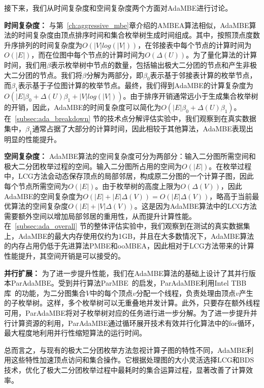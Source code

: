 接下来，我们从时间复杂度和空间复杂度两个方面对AdaMBE进行讨论。

\textbf{时间复杂度：} 与第~\ref{ch:aggressive_mbe}章介绍的AMBEA算法相似，AdaMBE算法的时间复杂度由顶点排序时间和集合枚举树生成时间组成。其中，按照顶点度数升序排列的时间复杂度为$O(|V|log(|V|))$，在邻接表中每个节点的计算时间为$O(|E|)$，而在位图中每个节点的计算时间为$O(\Delta(U))$。为了量化算法的计算时间，我们用$\beta$表示枚举树中节点的数量，包括输出极大二分团的节点和产生非极大二分团的节点。我们将$\beta$分解为两部分，即$\beta_0$表示基于邻接表计算的枚举节点，而$\beta_1$表示基于子位图计算的枚举节点。最终，我们得到AdaMBE的计算复杂度为$O(|E|\beta_0 + \Delta(U)\beta_1 + |V|log(|V|))$。由于排序开销通常远小于生成集合枚举树的开销，因此，AdaMBE的时间复杂度可以简化为$O(|E|\beta_0 + \Delta(U)\beta_1 )$。在~\ref{subsec:ada_breakdown} 节的技术点分解评估实验中，我们观察到在真实数据集中，$\beta_1$通常占据了大部分的计算时间，因此相较于其他算法，AdaMBE表现出明显的性能提升。

\textbf{空间复杂度：} AdaMBE算法的空间复杂度可分为两部分：输入二分图所需空间和极大二分团枚举过程的空间。输入二分图所占用的空间为$O(|E|)$。在枚举过程中，LCG方法会动态保存顶点的局部邻居，构成原二分图的一个计算子图，因此每个节点所需空间为$O(|E|)$。由于枚举树的高度上限为$O(\Delta(V))$，因此AdaMBE的空间复杂度为$O(|E|+|E|\Delta(V)) = O(|E|\Delta(V))$，略高于当前最优算法的空间复杂度$O(|E|+|V|\Delta(V))$。这是因为AdaMBE算法中的LCG方法需要额外空间以增加局部邻居的重用性，从而提升计算性能。在~\ref{subsec:ada_overall} 节的整体评估实验中，我们观察到在测试的真实数据集上，AdaMBE的最大内存使用仅约为1GB，并且在大多数情况下，AdaMBE算法的内存占用仍低于先进算法PMBE和ooMBEA，因此相对于LCG方法带来的计算性能提升，其空间开销是可以接受的。

\textbf{并行扩展：} 为了进一步提升性能，我们在AdaMBE算法的基础上设计了其并行版本ParAdaMBE。受到并行算法ParMBE~\cite{parMBE19}的启发，ParAdaMBE利用Intel TBB库~\cite{tbb-code}的功能，为二分图集合$V$中的每个顶点$v$分配一个线程，负责处理由顶点$v$产生的子枚举树。这样，多个枚举树可以无重叠地并发计算。此外，只要存在额外线程可用，ParAdaMBE将对子枚举树对应的任务进行进一步分解。为了进一步提升并行计算资源的利用，ParAdaMBE通过循环展开技术有效并行化算法中的for循环，最大程度地利用并行性缩短算法的运行时间。

总而言之，与现有的极大二分团枚举方法忽视计算子图的特性不同，AdaMBE利用这些特性加速顶点访问和集合操作。它根据处理图的大小灵活选择LCG和BDS技术，优化了极大二分团枚举过程中最耗时的集合运算过程，显著改善了计算效率。




